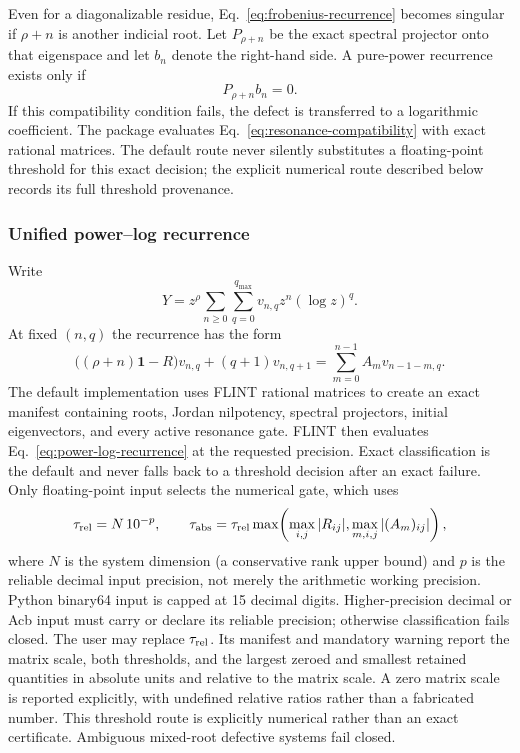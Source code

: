 \documentclass[11pt]{article}
\newcommand{\Id}{\mathbf 1}
\begin{document}
Even for a diagonalizable residue, Eq.~\eqref{eq:frobenius-recurrence} becomes singular if
$\rho+n$ is another indicial root.  Let $P_{\rho+n}$ be the exact spectral projector onto
that eigenspace and let $b_n$ denote the right-hand side.  A pure-power recurrence exists
only if
\begin{equation}
  P_{\rho+n}b_n=0.
  \label{eq:resonance-compatibility}
\end{equation}
If this compatibility condition fails, the defect is transferred to a logarithmic
coefficient.  The package evaluates Eq.~\eqref{eq:resonance-compatibility} with exact
rational matrices.  The default route never silently substitutes a floating-point threshold
for this exact decision; the explicit numerical route described below records its full
threshold provenance.

\subsubsection{Unified power--log recurrence}

Write
\begin{equation}
  Y=z^\rho\sum_{n\geq0}\sum_{q=0}^{q_{\max}}
  v_{n,q}z^n(\log z)^q.
\end{equation}
At fixed $(n,q)$ the recurrence has the form
\begin{equation}
  \bigl((\rho+n)\Id-R\bigr)v_{n,q}
  +(q+1)v_{n,q+1}
  =\sum_{m=0}^{n-1}A_m v_{n-1-m,q}.
  \label{eq:power-log-recurrence}
\end{equation}
The default implementation uses FLINT rational matrices to create an exact manifest
containing roots, Jordan nilpotency, spectral projectors, initial eigenvectors, and every
active resonance gate.  FLINT then evaluates Eq.~\eqref{eq:power-log-recurrence} at the
  requested precision.  Exact classification is the default and never falls back to a
  threshold decision after an exact failure.  Only floating-point input selects the
  numerical gate, which uses
\begin{equation}
  \tau_{\rm rel}=N\,10^{-p},
  \qquad
  \tau_{\rm abs}=\tau_{\rm rel}
  \max\!\left(\max_{i,j}|R_{ij}|,\max_{m,i,j}|(A_m)_{ij}|\right),
  \label{eq:numerical-log-threshold}
\end{equation}
where $N$ is the system dimension (a conservative rank upper bound) and $p$ is the reliable
decimal input precision, not merely the arithmetic working precision.  Python binary64
input is capped at 15 decimal digits.  Higher-precision decimal or Acb input must carry or
declare its reliable precision; otherwise classification fails closed.  The user may replace
$\tau_{\rm rel}$.  Its manifest and mandatory warning report the matrix scale, both
thresholds, and the largest zeroed and smallest retained quantities in absolute units and
relative to the matrix scale.  A zero matrix scale is reported explicitly, with undefined
relative ratios rather than a fabricated number.  This threshold route is explicitly
 numerical rather than an exact certificate.  Ambiguous mixed-root defective systems fail
 closed.
\end{document}
